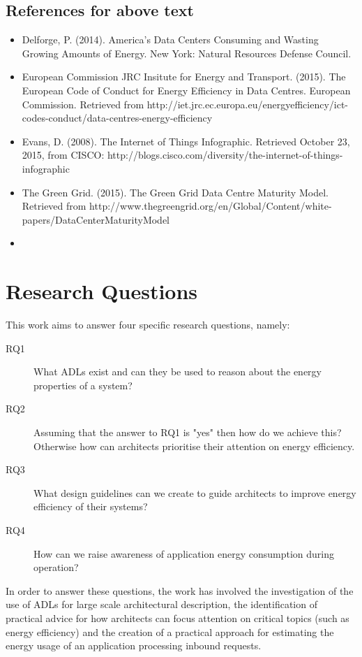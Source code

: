 \subsection{References for above text}
\begin{itemize}
	\item Delforge, P. (2014). America's Data Centers Consuming and Wasting Growing Amounts of Energy. New York: Natural Resources Defense Council.
    \item European Commission JRC Insitute for Energy and Transport. (2015). The European Code of Conduct for Energy Efficiency in Data Centres. European Commission. Retrieved from http://iet.jrc.ec.europa.eu/energyefficiency/ict-codes-conduct/data-centres-energy-efficiency
    \item Evans, D. (2008). The Internet of Things Infographic. Retrieved October 23, 2015, from CISCO: http://blogs.cisco.com/diversity/the-internet-of-things-infographic
    \item The Green Grid. (2015). The Green Grid Data Centre Maturity Model. Retrieved from http://www.thegreengrid.org/en/Global/Content/white-papers/DataCenterMaturityModel
    \item {} %
\end{itemize}


\section{Research Questions}

This work aims to answer four specific research questions, namely:

\begin{description}
\item [RQ1] What ADLs exist and can they be used to reason about the energy properties of a system?
\item [RQ2] Assuming that the answer to RQ1 is "yes" then how do we achieve this?  Otherwise how can architects prioritise their attention on energy efficiency.
\item [RQ3] What design guidelines can we create to guide architects to improve energy efficiency of their systems?
\item [RQ4] How can we raise awareness of application energy consumption during operation?
\end{description}

In order to answer these questions, the work has involved the investigation of the use of ADLs for large scale architectural description, the identification of practical advice for how architects can focus attention on critical topics (such as energy efficiency) and the creation of a practical approach for estimating the energy usage of an application processing inbound requests.

